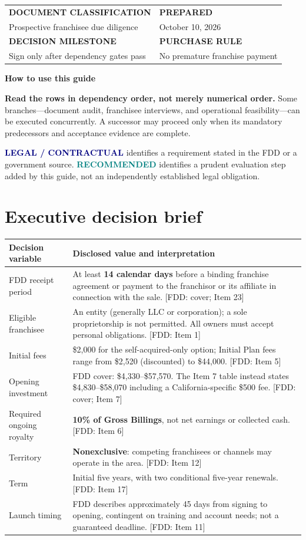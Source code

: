 \documentclass[10pt,letterpaper]{article}
\newcommand{\FDD}[1]{\textsf{\footnotesize\color{Muted} [FDD: #1]}}
\newcommand{\Req}{\textcolor{Navy}{\sffamily\bfseries LEGAL / CONTRACTUAL}}
\newcommand{\Rec}{\textcolor{Teal}{\sffamily\bfseries RECOMMENDED}}
\begin{document}
\vfill
\begin{tabularx}{\linewidth}{@{}Y Y@{}}
 \textbf{DOCUMENT CLASSIFICATION} & \textbf{PREPARED}\tabularnewline
 Prospective franchisee due diligence & October 10, 2026\tabularnewline
 \textbf{DECISION MILESTONE} & \textbf{PURCHASE RULE}\tabularnewline
 Sign only after dependency gates pass & No premature franchise payment\tabularnewline
\end{tabularx}
\clearpage

\begin{tcolorbox}[colback=PaleBlue,colframe=Rule]
{\sffamily\bfseries\color{Navy}\Large How to use this guide}\par
\textbf{Read the rows in dependency order, not merely numerical order.} Some
branches---document audit, franchisee interviews, and operational feasibility---can
be executed concurrently. A successor may proceed only when its mandatory
predecessors and acceptance evidence are complete.

\vspace{2pt}
\Req{} identifies a requirement stated in the FDD or a government source.
\Rec{} identifies a prudent evaluation step added by this guide, not an
independently established legal obligation.
\end{tcolorbox}
\tableofcontents
\clearpage

\section{Executive decision brief}
\begin{tabularx}{\linewidth}{@{}>{}p{.28\linewidth}Y@{}}
\toprule
\textbf{Decision variable}&\textbf{Disclosed value and interpretation}\\\midrule
FDD receipt period & At least \textbf{14 calendar days} before a binding franchise agreement or payment to the franchisor or its affiliate in connection with the sale. \FDD{cover; Item 23}\\
Eligible franchisee & An entity (generally LLC or corporation); a sole proprietorship is not permitted. All owners must accept personal obligations. \FDD{Item 1}\\
Initial fees & \$2,000 for the self-acquired-only option; Initial Plan fees range from \$2,520 (discounted) to \$44,000. \FDD{Item 5}\\
Opening investment & FDD cover: \$4,330--\$57,570. The Item 7 table instead states \$4,830--\$58,070 including a California-specific \$500 fee. \FDD{cover; Item 7}\\
Required ongoing royalty & \textbf{10\% of Gross Billings}, not net earnings or collected cash. \FDD{Item 6}\\
Territory & \textbf{Nonexclusive}: competing franchisees or channels may operate in the area. \FDD{Item 12}\\
Term & Initial five years, with two conditional five-year renewals. \FDD{Item 17}\\
Launch timing & FDD describes approximately 45 days from signing to opening, contingent on training and account needs; not a guaranteed deadline. \FDD{Item 11}\\
\bottomrule
\end{tabularx}
\end{document}
